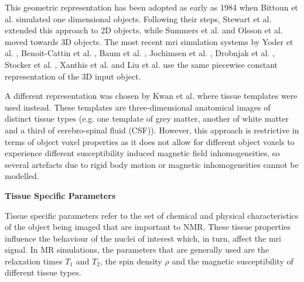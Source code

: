 This geometric representation has been adopted as early as 1984 when Bittoun et al. \cite{Bittoun1984} simulated one dimensional objects.
Following their steps, Stewart et al. \cite{Stewart1986} extended this approach to 2D objects, while Summers et al. \cite{Summers1986} and Olsson et al. \cite{Olsson1995} moved towards 3D objects.
The most recent \ac{mri} simulation systems by 
Yoder et al. \cite{Yoder2004}, 
Benoit-Cattin et al. \cite{Benoit-Cattin2005}, 
Baum et al. \cite{Baum2011}, 
Jochimsen et al. \cite{Jochimsen2004} \cite{Jochimsen2006}, 
Drobnjak et al. \cite{Drobnjak2006} \cite{Drobnjak2010}, 
Stocker et al. \cite{Stocker2010}, 
Xanthis et al. \cite{Xanthis2014} and 
Liu et al. \cite{Liu2013} \cite{Liu2014} \cite{Liu2016} use the same piecewise constant representation of the 3D input object.

\hfill

A different representation was chosen by
Kwan et al. \cite{Kwan1997} \cite{Kwan1999}
where tissue templates \cite{Collins1995} were used instead.
These templates are three-dimensional anatomical images of distinct tissue types (e.g. one template of grey matter, another of white matter and a third of cerebro-spinal fluid (CSF)). 
However, this approach is restrictive in terms of object voxel properties as it does not allow for different object voxels to experience different susceptibility induced magnetic field inhomogeneities, so several artefacts due to rigid body motion or magnetic inhomogeneities cannot be modelled.

\hfill

\large \textbf{Tissue Specific Parameters} \normalsize

Tissue specific parameters refer to the set of chemical and physical characteristics of the object being imaged that are important to NMR.
These tissue properties influence the behaviour of the nuclei of interest which, in turn, affect the \ac{mri} signal.
In MR simulations, the parameters that are generally used are the relaxation times $T_1$ and $T_2$, the spin density $\rho$ and the magnetic susceptibility of different tissue types.

